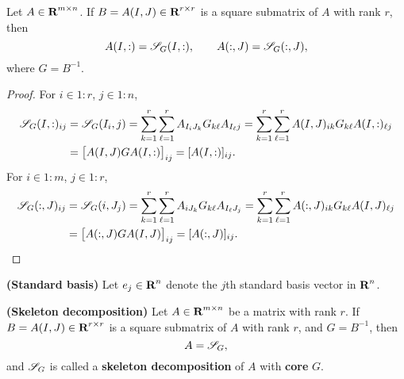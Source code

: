 \documentclass{article}
\begin{document}
	\begin{thm}
		\label{thm:skeleton_submatrix_exact}
		Let $A \in \textnormal{\bf R}^{m\times n}$. If $B = A(I,J) \in \textnormal{\bf R}^{r\times r}$ is a square submatrix of $A$ with rank $r$, then
		\begin{equation}
			\label{eq:skeleton_submatrix_exact}
			A(I,:) = \mathscr{S}_{G}(I,:), \qquad A(:,J) = \mathscr{S}_{G}(:,J),
		\end{equation}
		where $G = B^{-1}$.
	\end{thm}
	
	\begin{proof}
		For $i\in 1:r$, $j\in 1:n$,
		\begin{align}
			\mathscr{S}_{G}(I,:)_{ij} &= \mathscr{S}_{G}(I_i, j) = \sum_{k=1}^r\sum_{\ell=1}^rA_{I_iJ_k}G_{k\ell}A_{I_\ell j} = \sum_{k=1}^r\sum_{\ell=1}^rA(I,J)_{ik}G_{k\ell}A(I,:)_{\ell j} \\
			&= \big[A(I,J)GA(I,:)\big]_{ij} = [A(I,:)]_{ij}.
		\end{align}
		For $i\in 1:m$, $j\in 1:r$,
		\begin{align}
			\mathscr{S}_{G}(:, J)_{ij} &= \mathscr{S}_{G}(i, J_j) = \sum_{k=1}^r\sum_{\ell=1}^rA_{iJ_k}G_{k\ell}A_{I_\ell J_j} = \sum_{k=1}^r\sum_{\ell=1}^rA(:,J)_{ik}G_{k\ell}A(I,J)_{\ell j} \\
			&= \big[A(:,J)GA(I,J)\big]_{ij} = [A(:,J)]_{ij}.
		\end{align}
	\end{proof}
	
	\begin{dfn} \textnormal{\bf(Standard basis)}
		\label{def:standard_basis}
		Let $e_j \in \textnormal{\bf R}^n$ denote the $j$th standard basis vector in $\textnormal{\bf R}^n$.
	\end{dfn}
	
	\begin{thm} \textnormal{\bf(Skeleton decomposition)}
		\label{thm:skeleton}
		Let $A \in \textnormal{\bf R}^{m\times n}$ be a matrix with rank $r$. If $B = A(I,J) \in \textnormal{\bf R}^{r\times r}$ is a square submatrix of $A$ with rank $r$, and $G = B^{-1}$, then
		\begin{equation}
			\label{eq:skeleton}
			A = \mathscr{S}_{G},
		\end{equation}
		and $\mathscr{S}_{G}$ is called a \textbf{skeleton decomposition} of $A$ with \textbf{core} $G$.
	\end{thm}
	
\end{document}
